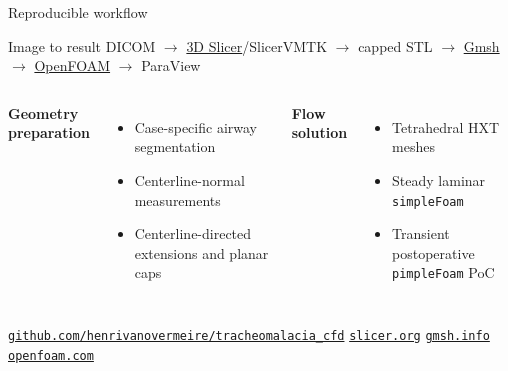 \documentclass[aspectratio=169,11pt]{beamer}
\begin{document}
\begin{frame}{Reproducible workflow}
  \centering
  \large
  \begin{block}{Image to result}
    DICOM $\rightarrow$ \href{https://www.slicer.org/}{3D Slicer}/SlicerVMTK $\rightarrow$ capped STL
    $\rightarrow$ \href{https://gmsh.info/}{Gmsh} $\rightarrow$
    \href{https://www.openfoam.com/}{OpenFOAM} $\rightarrow$ ParaView
  \end{block}
  \vspace{0.3em}
  \begin{columns}[T,onlytextwidth]
      \textbf{Geometry preparation}
      \begin{itemize}
        \item Case-specific airway segmentation
        \item Centerline-normal measurements
        \item Centerline-directed extensions and planar caps
      \end{itemize}
      \textbf{Flow solution}
      \begin{itemize}
        \item Tetrahedral HXT meshes
        \item Steady laminar \texttt{simpleFoam}
        \item Transient postoperative \texttt{pimpleFoam} PoC
      \end{itemize}
  \end{columns}
  \vspace{0.15em}
  \centering\scriptsize
  \href{https://github.com/henrivanovermeire/tracheomalacia_cfd}{\texttt{github.com/henrivanovermeire/tracheomalacia\_cfd}}\quad
  \href{https://www.slicer.org/}{\texttt{slicer.org}}\quad
  \href{https://gmsh.info/}{\texttt{gmsh.info}}\quad
  \href{https://www.openfoam.com/}{\texttt{openfoam.com}}
\end{frame}
\end{document}
